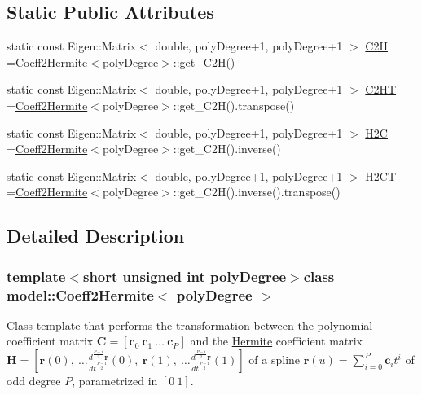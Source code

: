 \subsection*{Static Public Attributes}
\begin{DoxyCompactItemize}
\item 
static const Eigen\+::\+Matrix$<$ double, poly\+Degree+1, poly\+Degree+1 $>$ \hyperlink{classmodel_1_1_coeff2_hermite_ae14edceaff44a7fc6c7eb731bb160c50}{C2\+H} =\hyperlink{classmodel_1_1_coeff2_hermite}{Coeff2\+Hermite}$<$poly\+Degree$>$\+::get\+\_\+\+C2\+H()
\item 
static const Eigen\+::\+Matrix$<$ double, poly\+Degree+1, poly\+Degree+1 $>$ \hyperlink{classmodel_1_1_coeff2_hermite_ab08f71312bfb19e3322cf6963d703f8a}{C2\+H\+T} =\hyperlink{classmodel_1_1_coeff2_hermite}{Coeff2\+Hermite}$<$poly\+Degree$>$\+::get\+\_\+\+C2\+H().transpose()
\item 
static const Eigen\+::\+Matrix$<$ double, poly\+Degree+1, poly\+Degree+1 $>$ \hyperlink{classmodel_1_1_coeff2_hermite_a0fd83992299e5470dc15b9a2d27cedb8}{H2\+C} =\hyperlink{classmodel_1_1_coeff2_hermite}{Coeff2\+Hermite}$<$poly\+Degree$>$\+::get\+\_\+\+C2\+H().inverse()
\item 
static const Eigen\+::\+Matrix$<$ double, poly\+Degree+1, poly\+Degree+1 $>$ \hyperlink{classmodel_1_1_coeff2_hermite_a8bb020beda0ad879a53c84553a560b67}{H2\+C\+T} =\hyperlink{classmodel_1_1_coeff2_hermite}{Coeff2\+Hermite}$<$poly\+Degree$>$\+::get\+\_\+\+C2\+H().inverse().transpose()
\end{DoxyCompactItemize}


\subsection{Detailed Description}
\subsubsection*{template$<$short unsigned int poly\+Degree$>$class model\+::\+Coeff2\+Hermite$<$ poly\+Degree $>$}

Class template that performs the transformation between the polynomial coefficient matrix $ \mathbf{C}=\left[\mathbf{c}_0\ \mathbf{c}_1\ \ldots \ \mathbf{c}_P\right]$ and the \hyperlink{classmodel_1_1_hermite}{Hermite} coefficient matrix $ \mathbf{H}=\left[\mathbf{r}(0),\ \ldots \frac{d^\frac{P-1}{2}\mathbf{r}}{dt^\frac{P-1}{2}}(0),\ \mathbf{r}(1),\ \ldots \frac{d^\frac{P-1}{2}\mathbf{r}}{dt^\frac{P-1}{2}}(1)\right]$ of a spline $\mathbf{r}(u)=\sum_{i=0}^P\mathbf{c}_it^i$ of odd degree $P$, parametrized in $[0\ 1]$. 

